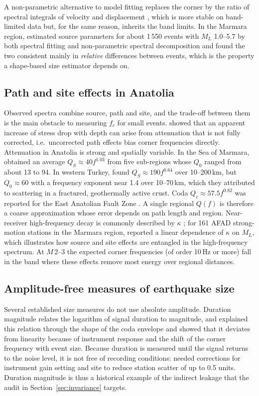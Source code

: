 \documentclass[11pt,a4paper]{article}
\newcommand{\fc}{f_c}
\begin{document}
A non-parametric alternative to model fitting replaces the corner by the
ratio of spectral integrals of velocity and displacement
\citep{andrews1986,snoke1987}, which is more stable on band-limited data
but, for the same reason, inherits the band limits. In the Marmara region,
\citet{chen2025} estimated source parameters for about 1\,550 events with
$M_L$ 1.0--5.7 by both spectral fitting and non-parametric spectral
decomposition and found the two consistent mainly in \emph{relative}
differences between events, which is the property a shape-based size
estimator depends on.

\subsection{Path and site effects in Anatolia}
Observed spectra combine source, path and site, and the trade-off between
them is the main obstacle to measuring $\fc$ for small events.
\citet{abercrombie2021depth} showed that an apparent increase of stress drop
with depth can arise from attenuation that is not fully corrected, i.e.\
uncorrected path effects bias corner frequencies directly. Attenuation in
Anatolia is strong and spatially variable. In the Sea of Marmara,
\citet{horasan2004} obtained an average $Q_S \approx 40 f^{1.03}$ from five
sub-regions whose $Q_0$ ranged from about 13 to 94. In western Turkey,
\citet{kurtulmus2013} found $Q_S \approx 190 f^{0.64}$ over 10--200\,km, but
$Q_0 \approx 60$ with a frequency exponent near 1.4 over 10--70\,km, which
they attributed to scattering in a fractured, geothermally active crust.
Coda $Q_c \approx 57.5 f^{0.82}$ was reported for the East Anatolian Fault
Zone \citep{sertcelik2012}. A single regional $Q(f)$ is therefore a coarse
approximation whose error depends on path length and region.
Near-receiver high-frequency decay is commonly described by $\kappa$
\citep{anderson1984}; for 161 AFAD strong-motion stations in the Marmara
region, \citet{sertcelik2022} reported a linear dependence of $\kappa$ on
$M_L$, which illustrates how source and site effects are entangled in the
high-frequency spectrum. At $M\,2$--3 the expected corner frequencies (of
order 10\,Hz or more) fall in the band where these effects remove most
energy over regional distances.

\subsection{Amplitude-free measures of earthquake size}
Several established size measures do not use absolute amplitude.
Duration magnitude relates the logarithm of signal duration to magnitude,
and \citet{herrmann1975} explained this relation through the shape of the
coda envelope and showed that it deviates from linearity because of
instrument response and the shift of the corner frequency with event size.
Because duration is measured until the signal returns to the noise level,
it is not free of recording conditions: \citet{michaelson1990} needed
corrections for instrument gain setting and site to reduce station
scatter of up to 0.5 units. Duration magnitude is thus a historical
example of the indirect leakage that the audit in Section~\ref{sec:invariance}
targets.
\end{document}
